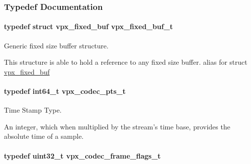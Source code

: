 \subsubsection{\-Typedef \-Documentation}
\hypertarget{group__encoder_ga21fab7dd28065f349c97165501223764}{
\paragraph[{vpx\-\_\-fixed\-\_\-buf\-\_\-t}]{\setlength{\rightskip}{0pt plus 5cm}typedef struct {\bf vpx\-\_\-fixed\-\_\-buf}  {\bf vpx\-\_\-fixed\-\_\-buf\-\_\-t}}}
\label{group__encoder_ga21fab7dd28065f349c97165501223764}


\-Generic fixed size buffer structure. 

\-This structure is able to hold a reference to any fixed size buffer. alias for struct \hyperlink{structvpx__fixed__buf}{vpx\-\_\-fixed\-\_\-buf} \hypertarget{group__encoder_ga7e711b0a71c65aef8f0faea8bd57b05f}{
\paragraph[{vpx\-\_\-codec\-\_\-pts\-\_\-t}]{\setlength{\rightskip}{0pt plus 5cm}typedef int64\-\_\-t {\bf vpx\-\_\-codec\-\_\-pts\-\_\-t}}}
\label{group__encoder_ga7e711b0a71c65aef8f0faea8bd57b05f}


\-Time \-Stamp \-Type. 

\-An integer, which when multiplied by the stream's time base, provides the absolute time of a sample. \hypertarget{group__encoder_gaac8ee319b9a6175f6946f59437c7ae4b}{
\paragraph[{vpx\-\_\-codec\-\_\-frame\-\_\-flags\-\_\-t}]{\setlength{\rightskip}{0pt plus 5cm}typedef uint32\-\_\-t {\bf vpx\-\_\-codec\-\_\-frame\-\_\-flags\-\_\-t}}}
\label{group__encoder_gaac8ee319b9a6175f6946f59437c7ae4b}


